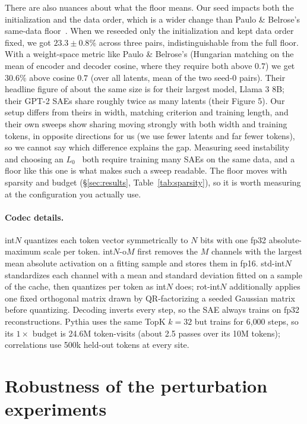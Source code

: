 \documentclass{article}
\begin{document}
There are also nuances about what the floor means. Our seed impacts
both the initialization and the data order, which is a wider change
than Paulo \& Belrose's same-data floor~\citep{paulo}. When we reseeded only the
initialization and kept data order fixed, we got $23.3 \pm 0.8\%$
across three pairs, indistinguishable from the full floor. With a
weight-space metric like Paulo \& Belrose's (Hungarian matching on the
mean of encoder and decoder cosine, where they require both above
$0.7$) we get $30.6\%$ above cosine $0.7$ (over all latents, mean of
the two seed-0 pairs). Their headline figure of about the same size is for their
largest model, Llama 3 8B; their GPT-2 SAEs share roughly twice as many
latents (their Figure 5). Our setup differs from theirs in width,
matching criterion and training length, and their own sweeps show
sharing moving strongly with both width and training tokens, in
opposite directions for us (we use fewer latents and far fewer tokens),
so we cannot say which difference explains the gap.
Measuring seed instability~\citep{paulo} and choosing an
$L_0$~\citep{chanin} both require training many SAEs on the same data,
and a floor like this one is what makes such a sweep readable. The floor moves with sparsity and budget
(\S\ref{sec:results}, Table~\ref{tab:sparsity}), so it is worth measuring at the configuration
you actually use.

\paragraph{Codec details.} int$N$ quantizes each token vector
symmetrically to $N$ bits with one fp32 absolute-maximum scale per
token. int$N$-o$M$ first removes the $M$ channels with the largest mean
absolute activation on a fitting sample and stores them in fp16.
std-int$N$ standardizes each channel with a mean and standard deviation
fitted on a sample of the cache, then quantizes per token as int$N$
does; rot-int$N$ additionally applies one fixed orthogonal matrix drawn
by QR-factorizing a seeded Gaussian matrix before quantizing. Decoding
inverts every step, so the SAE always trains on fp32 reconstructions.
Pythia uses the same TopK $k{=}32$ but trains for 6{,}000 steps, so its
$1\times$ budget is 24.6M token-visits (about 2.5 passes over its 10M
tokens); correlations use 500k held-out tokens at every site.

\section{Robustness of the perturbation experiments}
\label{app:robust}
\end{document}
